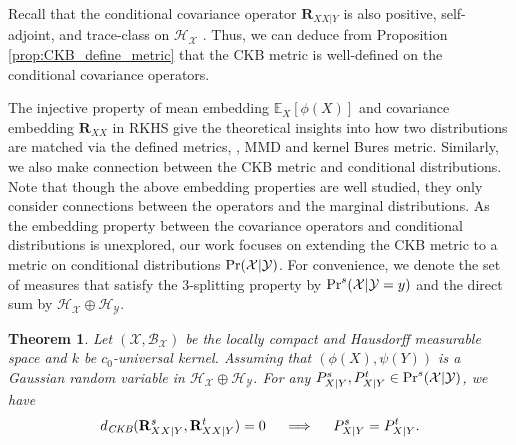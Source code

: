 \documentclass[final]{cvpr}
\newcommand{\MC}{\mathcal}
\newcommand{\MBB}{\mathbb}
\newcommand{\MBF}{\mathbf}
\newtheorem{definition}{Definition}
\newtheorem{theorem}{Theorem}
\begin{document}
Recall that the conditional covariance operator $\MBF{R}_{XX|Y}$ is also positive, self-adjoint, and trace-class on $\MC{H}_{\MC{X}}$ \cite{fukumizu2009kernel}. Thus, we can deduce from Proposition \ref{prop:CKB_define_metric} that the CKB metric is well-defined on the conditional covariance operators.

The injective property of mean embedding $\MBB{E}_{X} \left[\phi(X)\right]$ \cite{gretton2012kernel} and covariance embedding $\MBF{R}_{XX}$ \cite{zhang2019optimal} in RKHS give the theoretical insights into how two distributions are matched via the defined metrics, \eg, MMD and kernel Bures metric. Similarly, we also make connection between the CKB metric and conditional distributions. Note that though the above embedding properties are well studied, they only consider connections between the operators and the marginal distributions. As the embedding property between the covariance operators and conditional distributions is unexplored, our work focuses on extending the CKB metric to a metric on conditional distributions ${\rm Pr}(\MC{X}|\MC{Y})$. For convenience, we denote the set of measures that satisfy the 3-splitting property \cite{zhang2019optimal} by ${\rm Pr}^s(\MC{X}|\MC{Y}=y)$ and the direct sum by $\MC{H}_{\MC{X}}\oplus \MC{H}_{\MC{Y}}$.


\begin{theorem}\label{thm:conditional-kernel-bures_metricThm}
Let $(\MC{X},\MC{B}_{\MC{X}})$ be the locally compact and Hausdorff measurable space and $k$ be $c_0$-universal kernel. Assuming that $\left( \phi (X),\psi (Y) \right)$ is a Gaussian random variable in $\MC{H}_{\MC{X}}\oplus \MC{H}_{\MC{Y}}$. %
For any $P^{s}_{X|Y}, P^{t}_{X|Y} \in {\rm Pr}^s(\MC{X}|\MC{Y})$, we have
\begin{equation*}\label{eq:conditional-kernel-bures_metricThm}
d_{\emph{CKB}}(\MBF{R}^{s}_{XX|Y},\MBF{R}^{t}_{XX|Y})=0 ~~~~ \Longrightarrow ~~~~ P^{s}_{X|Y}=P^{t}_{X|Y}.
\end{equation*}
\end{theorem}
\end{document}
